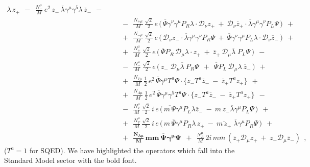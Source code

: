 \documentclass[12pt]{revtex4}
\begin{document}
\begin{eqnarray}
\lambda\, z_+ 
~~-~~
\frac{N_-^\mu}{M}\, e^2\,
z_-\, \overline{\lambda}\gamma^\mu\gamma^5
\lambda\, \overline{z}_-
~~-~~ \\
\nonumber
&&
~~-~~
\frac{N_{+\mu}}{M}\,
\frac{\sqrt{2}}{2}\, e\,
\Big(\,
\overline{\Psi} \gamma^\nu\gamma^\mu P_R
\lambda \cdot \mathcal{D}_\nu z_+ 
~+~
\mathcal{D}_\nu \overline{z}_+ \cdot
\overline{\lambda} \gamma^\mu \gamma^\nu
P_L \Psi
\,
\Big)
~~+~~ \\
\nonumber
&&
~~+~~
\frac{N_{-\mu}}{M}\,
\frac{\sqrt{2}}{2}\,e\,
\Big(\,
\mathcal{D}_\nu z_- \cdot
\overline{\lambda}\gamma^\mu\gamma^\nu P_R \Psi
~+~
\overline{\Psi}\gamma^\nu\gamma^\mu P_L \lambda
\cdot \mathcal{D}_\nu \overline{z}_-
\,
\Big)
~~+~~ \\
\label{LV_matter_component}
&&
~~+~~
\frac{N_+^\mu}{M}\,
\frac{\sqrt{2}}{2}\, e\,
\Big(\,
\overline{\Psi}P_R\, \mathcal{D}_\mu \lambda
\cdot z_+ 
~+~
\overline{z}_+ \,
\mathcal{D}_\mu 
\overline{\lambda}\; P_L \Psi
\,\Big)
~~-~~ \\
\nonumber
&&
~~-~~
\frac{N_-^\mu}{M}\,
\frac{\sqrt{2}}{2}\, e\,
\Big(\,
z_-\; \mathcal{D}_\mu \overline{\lambda} ~
P_R \Psi 
~~+~~
\overline{\Psi} P_L \, \mathcal{D}_\mu \lambda ~
\overline{z}_-
\,\Big) 
~~+~~ \\
\nonumber
&&
~~+~~ 
\frac{N_{V\mu}}{M}\,
\frac{1}{2}\, e^2\,
\overline{\Psi}\gamma^\mu T^a \Psi \cdot
\Big\{
  z_- T^a \overline{z}_- 
  ~-~
  \overline{z}_+ T^a z_+
\Big\}
~~+~~ \\
\nonumber
&&
~~+~~
\frac{N_{A\mu}}{M}\,
\frac{1}{2}\, e^2\,
\overline{\Psi}\gamma^\mu \gamma^5 T^a \Psi \cdot
\Big\{
  z_- T^a \overline{z}_- 
  ~-~
  \overline{z}_+ T^a z_+
\Big\}
~~-~~ \\
\nonumber
&&
~~-~~
\frac{N_V^\mu}{M}\,
\frac{\sqrt{2}}{2}\, i\, e\,
\Big(\,
\overline{m\, \Psi} \gamma^\mu P_L
\lambda \overline{z}_- 
~-~
m\, z_- \overline{\lambda}
\gamma^\mu P_L \Psi
\,\Big)
~~+~~ \\
\nonumber
&&
~~+~~
\frac{N_V^\mu}{M}\,
\frac{\sqrt{2}}{2}\, i\, e\,
\Big(\,
m\, \overline{\Psi}\gamma^\mu P_R \lambda\, z_+ 
~-~
\overline{m\, z_+}\; \overline{\lambda}
\gamma^\mu P_R \Psi
\,\Big)
~~+~~ \\
\nonumber
&&
~~+~~
\boldsymbol{
\frac{N_{A\mu}}{M}\,
m \overline{m} \,
\overline{\Psi} \gamma^\mu \Psi
    }
~~+~~ 
\frac{N_A^\mu}{M}\, 2 i\, m \overline{m}\,
\left( 
\overline{z}_+ \mathcal{D}_\mu z_+ 
~+~
z_- \mathcal{D}_\mu \overline{z}_-
\right)
~~,
\end{eqnarray}
($ T^a = 1 $ for SQED).
We have highlighted the operators which fall into the 
Standard Model sector with the bold font.
\end{document}
